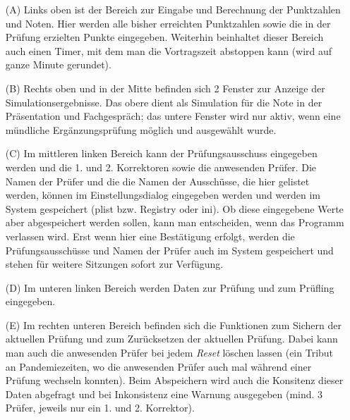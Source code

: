 \documentclass[a4paper,notitlepage,parskip=half]{scrartcl}
\begin{document}
\begin{itemize}
\item[(A)] Links oben ist der Bereich zur Eingabe und Berechnung der Punktzahlen und Noten. 
Hier werden alle bisher erreichten Punktzahlen sowie die in der Prüfung erzielten Punkte eingegeben.
Weiterhin beinhaltet dieser Bereich auch einen Timer, mit dem man die Vortragszeit abstoppen kann (wird auf ganze Minute gerundet).
\item[(B)] Rechts oben und in der Mitte befinden sich 2 Fenster zur Anzeige der Simulationsergebnisse. Das obere dient als Simulation für die Note in der Präsentation und Fachgespräch; das untere Fenster wird nur aktiv, wenn eine mündliche Ergänzungsprüfung möglich und ausgewählt wurde. 
\item[(C)] Im mittleren linken Bereich kann der Prüfungsausschuss eingegeben werden und die 1. und 2. Korrektoren sowie die anwesenden Prüfer. Die Namen der Prüfer und die die Namen der Ausschüsse, die hier gelistet werden, können im Einstellungsdialog eingegeben werden und werden im System gespeichert (plist bzw. Registry oder ini). Ob diese eingegebene Werte aber abgespeichert werden sollen, kann man entscheiden, wenn das Programm verlassen wird. Erst wenn hier eine Bestätigung erfolgt, werden die Prüfungsausschüsse und Namen der Prüfer auch im System gespeichert und stehen für weitere Sitzungen sofort zur Verfügung.
\item[(D)] Im unteren linken Bereich werden Daten zur Prüfung und zum Prüfling eingegeben.
\item[(E)] Im rechten unteren Bereich befinden sich die Funktionen zum Sichern der aktuellen Prüfung und zum Zurücksetzen der aktuellen Prüfung. Dabei kann man auch die anwesenden Prüfer bei jedem \emph{Reset} löschen lassen (ein Tribut an Pandemiezeiten, wo die anwesenden Prüfer auch mal während einer Prüfung wechseln konnten). Beim Abspeichern wird auch die Konsitenz dieser Daten abgefragt und bei Inkonsistenz eine Warnung ausgegeben (mind. 3 Prüfer, jeweils nur ein 1. und 2. Korrektor).
\end{itemize} 
\end{document}
